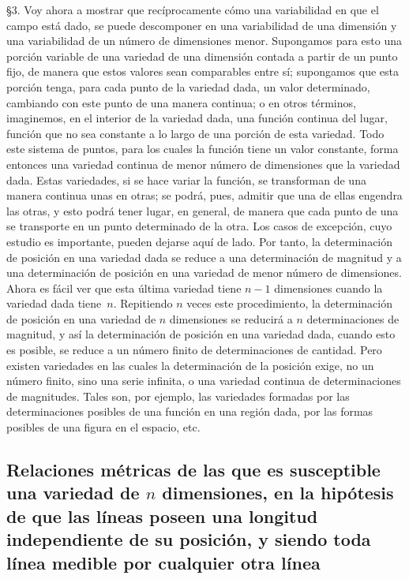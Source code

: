 \documentclass[a4paper, 12pt]{article}
\begin{document}
\S 3.\hspace{3 mm} Voy ahora a mostrar que recíprocamente cómo una variabilidad en que el campo está dado, se puede descomponer en una variabilidad de una dimensión y una variabilidad de un número de dimensiones menor. Supongamos para esto una porción variable de una variedad de una dimensión contada a partir de un punto fijo, de manera que estos valores sean comparables entre sí; supongamos que esta porción tenga, para cada punto de la variedad dada, un valor determinado, cambiando con este punto de una manera continua; o en otros términos, imaginemos, en el interior de la variedad dada, una función continua del lugar, función que no sea constante a lo largo de una porción de esta variedad. Todo este sistema de puntos, para los cuales la función tiene un valor constante, forma entonces una variedad continua de menor número de dimensiones que la variedad dada.  Estas variedades, si se hace variar la función, se transforman de una manera continua unas en otras; se podrá, pues, admitir que una de ellas engendra las otras, y esto podrá tener lugar, en general, de manera que cada punto de una se transporte en un punto determinado de la otra. Los casos de excepción, cuyo estudio es importante, pueden dejarse aquí de lado. Por tanto, la determinación de posición en una variedad dada se reduce a una determinación de magnitud y a una determinación de posición en una variedad de menor número de dimensiones. Ahora es fácil ver que esta última variedad tiene $n-1$ dimensiones cuando la variedad dada tiene~$n$. Repitiendo $n$ veces este procedimiento, la determinación de posición en una variedad de $n$ dimensiones se reducirá a $n$ determinaciones de magnitud, y así la determinación de posición en una variedad dada, cuando esto es posible, se reduce a un número finito de determinaciones de cantidad. Pero existen variedades en las cuales la determinación de la posición exige, no un número finito, sino una serie infinita, o una variedad continua de determinaciones de magnitudes. Tales son, por ejemplo, las variedades formadas por las determinaciones posibles de una función en una región dada, por las formas posibles de una figura en el espacio, etc.
   
\subsection*{Relaciones métricas de las que es susceptible una variedad de $n$ dimensiones, en la hipótesis de que las líneas poseen una longitud independiente de su posición, y siendo toda línea medible por cualquier otra línea}
\end{document}
